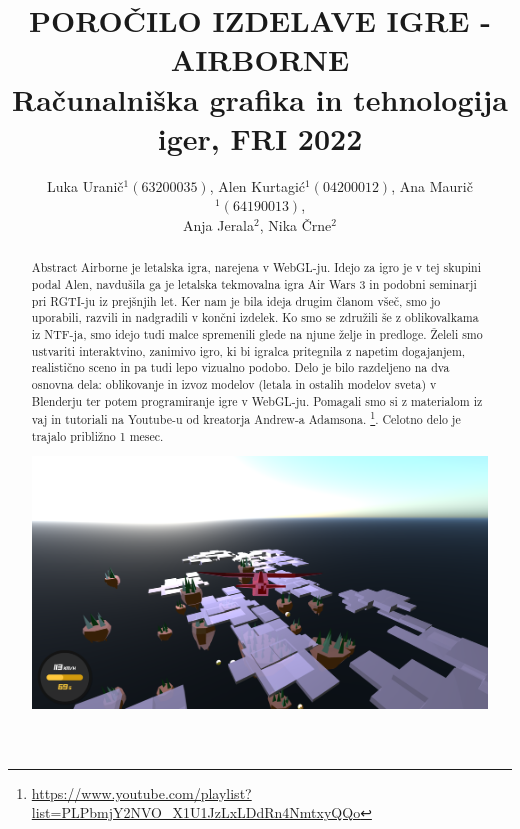 \documentclass[a4paper]{article}
\begin{document}
\title{POROČILO IZDELAVE IGRE - AIRBORNE \\
 Računalniška grafika in tehnologija iger, FRI 2022}

\author{Luka Uranič$^{1} (63200035)$, Alen Kurtagić$^{1} (04200012)$,  Ana Maurič$^{1} (64190013)$, \\ Anja Jerala$^{2}$,  Nika Črne$^{2}$} %



\maketitle


\begin{abstract}{Abstract}%
Airborne je letalska igra, narejena v WebGL-ju. Idejo za igro je v tej skupini podal Alen, navdušila ga je letalska tekmovalna igra Air Wars 3 in podobni seminarji pri RGTI-ju iz prejšnjih let. Ker nam je bila ideja drugim članom všeč, smo jo uporabili, razvili in nadgradili v končni izdelek. Ko smo se združili še z oblikovalkama iz NTF-ja, smo idejo tudi malce spremenili glede na njune želje in predloge. Želeli smo ustvariti interaktvino, zanimivo igro, ki bi igralca pritegnila z napetim dogajanjem, realistično sceno in pa tudi lepo vizualno podobo. Delo je bilo razdeljeno na dva osnovna dela: oblikovanje in izvoz modelov (letala in ostalih modelov sveta) v Blenderju ter potem programiranje igre v WebGL-ju. Pomagali smo si z materialom iz vaj in tutoriali na Youtube-u od kreatorja Andrew-a Adamsona. \footnote{\url{https://www.youtube.com/playlist?list=PLPbmjY2NVO_X1U1JzLxLDdRn4NmtxyQQo}}. Celotno delo je trajalo približno 1 mesec. 
\begin{center}
     \includegraphics[width=\columnwidth]{igra.jpg}
\end{center}
\end{abstract}
\end{document}
